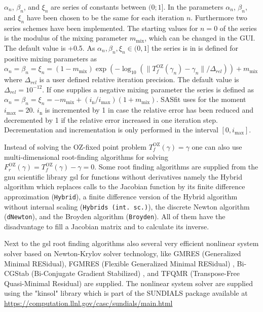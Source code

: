 $\alpha_n$, $\beta_n$, and $\xi_n$ are series of constants between $(0;1]$. In \SASfit the parameters $\alpha_n$, $\beta_n$, and $\xi_n$ have been chosen to be the same for each iteration $n$. Furthermore two series schemes have been implemented. The starting values for $n=0$ of the series is the modulus of the mixing parameter $m_\mathrm{mix}$, which can be changed in the GUI. The default value is +0.5. As $\alpha_n,\beta_n,\xi_n \in (0,1]$ the series is in \SASfit is defined for positive mixing parameters as $\alpha_n=\beta_n=\xi_n=(1-m_\mathrm{mix}) \exp\left(-\log_{10}( \|T^\mathrm{OZ}_f(\gamma_{n})-\gamma_{n}\|/\Delta_{rel})\right)+m_\mathrm{mix}$ where $\Delta_{rel}$ is a user defined relative iteration precision. The default value is $\Delta_{rel}=10^{-12}$. If one supplies a negative mixing parameter the series is defined as  $\alpha_n=\beta_n=\xi_n=-m_\mathrm{mix}+(i_\mathrm{n}/i_\mathrm{max}) \left(1+m_\mathrm{mix}\right)$. SASfit uses for the moment $i_\mathrm{max}=20$. $i_\mathrm{n}$ is incremented by 1 in case the relative error has been reduced and decremented by 1 if the relative error increased in one iteration step. Decrementation and incrementation is only performed in the interval $[0,i_\mathrm{max}]$.

Instead of solving the OZ-fixed point problem $T^\mathrm{OZ}_f(\gamma)=\gamma$ one can also use multi-dimensional root-finding algorithms for solving $F^\mathrm{OZ}_r(\gamma)=T^\mathrm{OZ}_f(\gamma)-\gamma=0$. Some root finding algorithms are supplied from the gnu scientific library gsl for functions without derivatives namely the Hybrid algorithm which replaces calls to the Jacobian function by its finite difference approximation (\texttt{Hybrid}), a finite difference version of the Hybrid algorithm without internal scaling (\texttt{Hybrids (int. sc.)}), the discrete Newton algorithm (\texttt{dNewton}), and the Broyden algorithm (\texttt{Broyden}). All of them have the disadvantage to fill a Jacobian matrix and to calculate its inverse.

Next to the gsl root finding algorithms also several very efficient nonlinear system solver based on Newton-Krylov solver technology, like GMRES (Generalized Minimal RESidual)\cite{Saad1986,Kelley2003}, FGMRES (Flexible Generalized Minimal RESidual) \cite{Saad1993}, Bi-CGStab (Bi-Conjugate Gradient Stabilized) \cite{Vorst1992,Kelley2003}, and TFQMR (Transpose-Free Quasi-Minimal Residual) \cite{Freund1993,Kelley2003} are supplied. The nonlinear system solver are supplied using the "kinsol" library which is part of the SUNDIALS package \cite{Hindmarsh2005} available at \url{https://computation.llnl.gov/casc/sundials/main.html}

